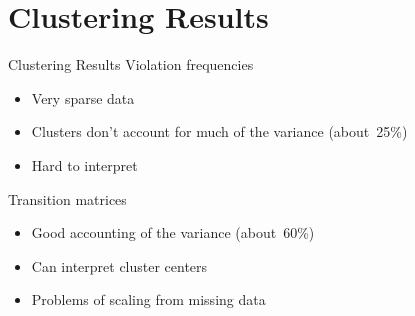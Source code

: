 \documentclass[12pt]{beamer}
\begin{document}
\section{Clustering Results}
\begin{frame}{Clustering Results}
\vfill
Violation frequencies
\begin{itemize}
	\item Very sparse data
	\item Clusters don't account for much of the variance (about~25\%)
	\item Hard to interpret
\end{itemize}
\vfill
Transition matrices
\begin{itemize}
	\item Good accounting of the variance (about~60\%)
	\item Can interpret cluster centers
	\item Problems of scaling from missing data
\end{itemize}
\vfill
\end{frame}
\end{document}
